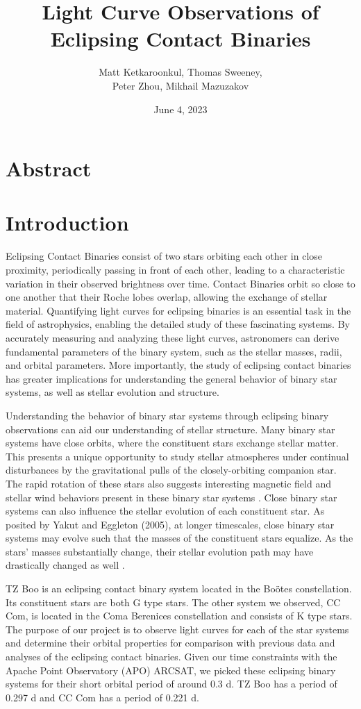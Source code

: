 \documentclass{article}
\title{\vspace{-2em} {\bf Light Curve Observations of Eclipsing Contact Binaries}}
\author{Matt Ketkaroonkul, Thomas Sweeney, \\ Peter Zhou, Mikhail Mazuzakov}
\date{June 4, 2023}
\begin{document}
\maketitle

\section{Abstract}
\section{Introduction}

Eclipsing Contact Binaries consist of two stars orbiting each other in close proximity, periodically passing in front of each other, leading to a characteristic variation in their observed brightness over time. Contact Binaries orbit so close to one another that their Roche lobes overlap, allowing the exchange of stellar material. Quantifying light curves for eclipsing binaries is an essential task in the field of astrophysics, enabling the detailed study of these fascinating systems. By accurately measuring and analyzing these light curves, astronomers can derive fundamental parameters of the binary system, such as the stellar masses, radii, and orbital parameters. More importantly, the study of eclipsing contact binaries has greater implications for understanding the general behavior of binary star systems, as well as stellar evolution and structure.

Understanding the behavior of binary star systems through eclipsing binary observations can aid our understanding of stellar structure. Many binary star systems have close orbits, where the constituent stars exchange stellar matter. This presents a unique opportunity to study stellar atmospheres under continual disturbances by the gravitational pulls of the closely-orbiting companion star. The rapid rotation of these stars also suggests interesting magnetic field and stellar wind behaviors present in these binary star systems \cite{2001icbs.book.....H}. Close binary star systems can also influence the stellar evolution of each constituent star. As posited by Yakut and Eggleton (2005), at longer timescales, close binary star systems may evolve such that the masses of the constituent stars equalize. As the stars’ masses substantially change, their stellar evolution path may have drastically changed as well \cite{2005ApJ...629.1055Y}.

	TZ Boo is an eclipsing contact binary system located in the Boötes constellation. Its constituent stars are both G type stars. The other system we observed, CC Com, is located in the Coma Berenices constellation and consists of K type stars. The purpose of our project is to observe light curves for each of the star systems and determine their orbital properties for comparison with previous data and analyses of the eclipsing contact binaries. Given our time constraints with the Apache Point Observatory (APO) ARCSAT, we picked these eclipsing binary systems for their short orbital period of around 0.3 d. TZ Boo has a period of 0.297 d and CC Com has a period of 0.221 d. 
\end{document}

